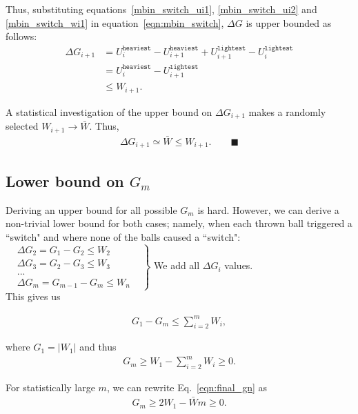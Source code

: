 \documentclass[12pt,psfig,a4]{article}
\theoremstyle{plain}
\begin{document}
Thus, substituting equations~\ref{mbin_switch_ui1}, \ref{mbin_switch_ui2} and \ref{mbin_switch_wi1} in equation~\ref{eqn:mbin_switch}, $\Delta G$ is upper bounded as follows:
\begin{align}
\nonumber
	\Delta G_{i+1}&= U_{i}^{\texttt{heaviest}} - U_{i+1}^{\texttt{heaviest}}  + U_{i+1}^{\texttt{lightest}} - U_{i}^{\texttt{lightest}}  \\ \nonumber
	&= U_{i}^{\texttt{heaviest}} - U_{i+1}^{\texttt{lightest}} \\
	&\leq W_{i+1}.
	\label{eqn:mbin_switch_bound}
\end{align}

A statistical investigation of the upper bound on $\Delta G_{i+1}$ makes a randomly selected $W_{i+1}\rightarrow \bar{W}$. Thus,
\begin{align}
	\Delta G_{i+1} \simeq \bar{W}\leq W_{i+1}. \qquad \blacksquare
	\label{eqn:mbin_switch_tightbound}
\end{align} 

\subsection{Lower bound on $G_m$}
 Deriving an upper bound for all possible $G_m$ is hard. However, we can derive a non-trivial lower bound for both cases; namely, when each thrown ball triggered a ``switch" and where none of the balls caused a ``switch": \\


$\left . \begin{matrix}
 & \Delta G_2 = G_1 - G_2  \leq W_2 & \\
 & \Delta G_3 = G_2 - G_3  \leq W_3 & \\
 & ... & \\ 
 & \Delta G_m = G_{m-1} - G_m  \leq W_n & 
\end{matrix}\right \}$ 
We add all $\Delta G_i$ values. \\

This gives us 

\begin{align}
\nonumber
 G_1 - G_m \leq \sum_{i=2}^{m} W_i,
 \end{align}
 
 where $G_1=|W_1|$ and thus
  \begin{align}
   G_m \geq W_1 - \sum_{i=2}^{m} W_i \geq 0. 
   \label{eqn:final_gn}
 \end{align}
 
For statistically large $m$, we can rewrite Eq.~\ref{eqn:final_gn} as
 \begin{align}
   G_m \geq 2W_1 - \bar{W}m \geq 0.
   \label{eqn:final_gn_stat}
 \end{align}
\end{document}
